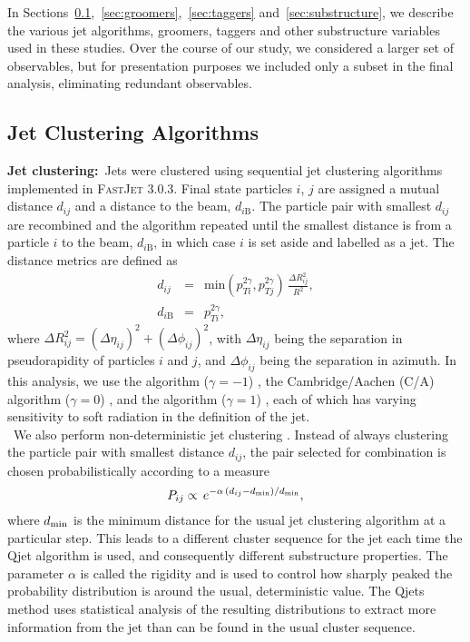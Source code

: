 In Sections~\ref{sec:jetalgs},~\ref{sec:groomers},~\ref{sec:taggers} and~\ref{sec:substructure}, we describe the various jet algorithms, groomers, taggers and other substructure variables used in these studies. Over the course of our study, we considered a larger set of observables, but for presentation purposes we included only a subset in the final analysis, eliminating redundant observables.

\subsection{Jet Clustering Algorithms}
\label{sec:jetalgs}

{\bf Jet clustering:}~Jets were clustered using sequential jet clustering algorithms \cite{Bethke:1988zc} implemented in \textsc{FastJet} 3.0.3. Final state particles $i$, $j$ are assigned a mutual distance $d_{ij}$ and a distance to the beam, $d_{i\mathrm{B}}$. The particle pair with smallest $d_{ij}$ are  recombined and the algorithm repeated until the smallest distance is from a particle $i$ to the beam, $d_{i\mathrm{B}}$, in which case $i$ is set aside and labelled as a jet. The distance metrics are defined as
%
\begin{eqnarray}
d_{ij} &=& \mathrm{min}(p_{Ti}^{2\gamma},p_{Tj}^{2\gamma})\,\frac{\Delta R_{ij}^2}{R^2},\\
d_{i\mathrm{B}} &=& p_{Ti}^{2\gamma},
\end{eqnarray}
%
where $\Delta R_{ij}^2=(\Delta \eta_{ij})^2+(\Delta\phi_{ij})^2$, with $\Delta \eta_{ij}$ being the separation in pseudorapidity of particles $i$ and $j$, and $\Delta \phi_{ij}$ being the separation in azimuth. In this analysis, we use the \antikt algorithm ($\gamma=-1$) \cite{Cacciari:2008gp}, the Cambridge/Aachen (C/A) algorithm ($\gamma=0$) \cite{Dokshitzer:1997in,Wobisch:1998wt}, and the \kT algorithm ($\gamma=1$) \cite{Catani:1993hr,Ellis:1993tq}, each of which has varying sensitivity to soft radiation in the definition of the jet.\\

~We also perform non-deterministic jet clustering \cite{Ellis:2012sn,Ellis:2014eya}. Instead of always clustering the particle pair with smallest distance $d_{ij}$, the pair selected for combination is chosen probabilistically according to a measure
%
\begin{equation}
P_{ij} \propto \,e^{-\alpha \,(d_{ij}-d_{\rm min})/d_{\rm min}},
\end{equation}
%
where $d_{\rm min}$ is the minimum distance for the usual jet clustering algorithm at a particular step. This leads to a different cluster sequence for the jet each time the Qjet algorithm is used, and consequently different substructure properties. The parameter $\alpha$ is called the rigidity and is used to control how sharply peaked the probability distribution is around the usual, deterministic value. The Qjets method uses statistical analysis of the resulting distributions to extract more information from the jet than can be found in the usual cluster sequence.

